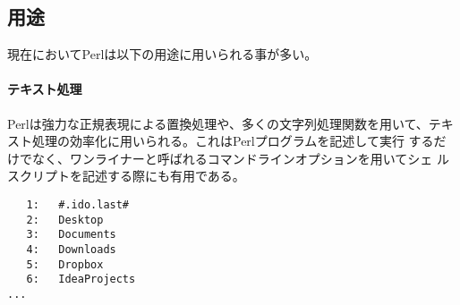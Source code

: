 \documentclass[a4paper,9pt]{jarticle}
\begin{document}
\subsection{用途}
現在においてPerlは以下の用途に用いられる事が多い。
\paragraph*{テキスト処理}
Perlは強力な正規表現による置換処理や、多くの文字列処理関数を用いて、テキ
スト処理の効率化に用いられる。これはPerlプログラムを記述して実行
するだけでなく、ワンライナーと呼ばれるコマンドラインオプションを用いてシェ
ルスクリプトを記述する際にも有用である。

\begin{lstlisting}[caption=標準入力のソースに行番号を付けて標準出力へ]
% ls | perl -ple '$_=sprintf("%4d",$.).":\t".$_'
   1:	#.ido.last#
   2:	Desktop
   3:	Documents
   4:	Downloads
   5:	Dropbox
   6:	IdeaProjects
...
\end{lstlisting}　
\end{document}
